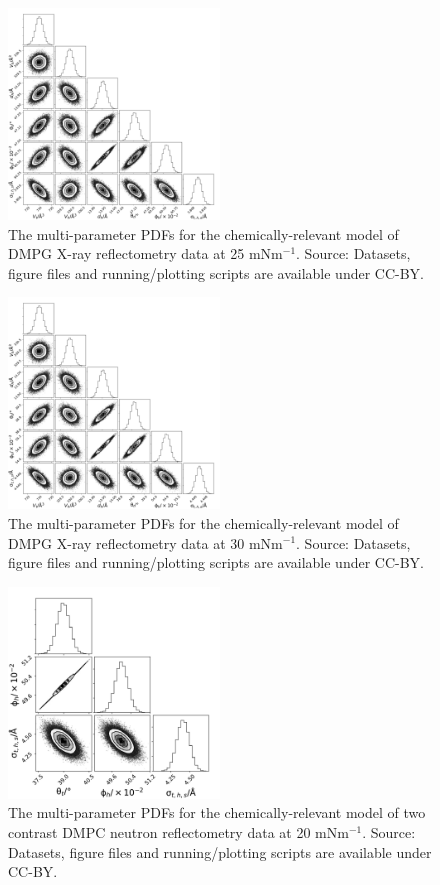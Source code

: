 \documentclass[11pt,a4paper]{article}
\begin{document}
\begin{figure}[h]
	\centering
	\includegraphics[width=0.50\textwidth]{figures/dmpg3_all_corner}
	\caption{The multi-parameter PDFs for the chemically-relevant model of DMPG X-ray reflectometry data at 25 mNm$^{-1}$. Source: Datasets, figure files and running/plotting scripts are available under CC-BY.\cite{mccluskey_2018}}
	\label{fig:dmpg4}
\end{figure}
\begin{figure}
	\centering
	\includegraphics[width=0.50\textwidth]{figures/dmpg4_all_corner}
	\caption{The multi-parameter PDFs for the chemically-relevant model of DMPG X-ray reflectometry data at 30 mNm$^{-1}$. Source: Datasets, figure files and running/plotting scripts are available under CC-BY.\cite{mccluskey_2018}}
	\label{fig:dmpg5}
\end{figure}
\begin{figure}[h]
	\centering
	\includegraphics[width=0.50\textwidth]{figures/dmpc_20n_all_corner}
	\caption{The multi-parameter PDFs for the chemically-relevant model of two contrast DMPC neutron reflectometry data at 20 mNm$^{-1}$. Source: Datasets, figure files and running/plotting scripts are available under CC-BY.\cite{mccluskey_2018}}
	\label{fig:dmpcn1}
\end{figure}
\end{document}
